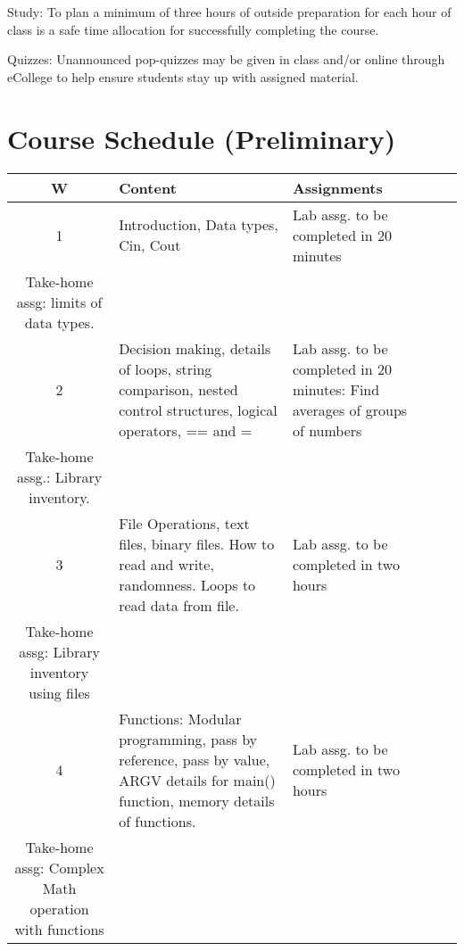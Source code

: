 \documentclass[11pt]{article}
\begin{document}
Study: To plan a minimum of three hours of outside preparation for
each hour of class is a safe time allocation for successfully
completing the course.

Quizzes: Unannounced pop-quizzes may be given in class and/or online
through eCollege to help ensure students stay up with assigned
material.
\section*{Course Schedule (Preliminary)}
\label{sec-11}



\begin{center}
\begin{tabular*}{0.94\textwidth}{cl|p{2.25in}|r|l}
\hline
 \textbf{W}  &  \textbf{Content}                                                                                                                      &  \textbf{Assignments}                                                                                                                                     \\
\hline
\hline
          1  &  Introduction, Data types, Cin, Cout                                                                                                   &  Lab assg. to be completed in 20 minutes \\ Take-home assg: limits of data types.                                                                         \\
\hline
          2  &  Decision making, details of loops, string comparison, nested control structures, logical operators, == and =                          &  Lab assg. to be completed in 20 minutes: Find averages of groups of numbers \\ Take-home assg.: Library inventory.                                       \\
\hline
          3  &  File Operations, text files, binary files.  How to read and write, randomness.  Loops to read data from file.                         &  Lab assg. to be completed in two hours \\ Take-home assg: Library inventory using files                                                                  \\
\hline
          4  &  Functions: Modular programming, pass by reference, pass by value, ARGV details for main() function, memory details of functions.      &  Lab assg. to be completed in two hours \\ Take-home assg: Complex Math operation with functions                                                          \\

\end{tabular*}
\end{center}
\end{document}
